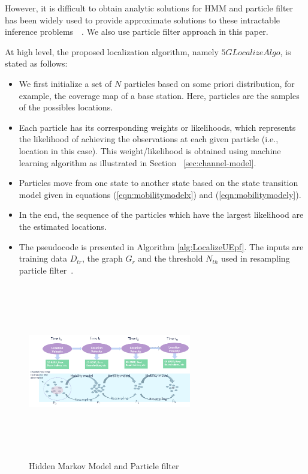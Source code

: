 \documentclass[conference, 10pt]{IEEEtran}
\begin{document}
However, it is difficult to obtain analytic solutions for HMM and particle filter has been widely used to provide approximate solutions to these intractable inference problems~\cite{doucet2009tutorial}~\cite{ThrunParticleFilter}.
We also use particle filter approach in this paper. 

At high level, the proposed localization algorithm, namely $5GLocalizeAlgo$, is stated as follows:
\begin{itemize}
	\item We first initialize a set of $N$ particles based on some priori distribution, for example, the coverage map of a base station.
	Here, particles are the samples of the possibles locations. 
	\item Each particle has its corresponding weights or likelihoods, which represents the likelihood of achieving the observations at each given particle (i.e., location in this case). This weight/likelihood is obtained using machine learning algorithm as illustrated in Section ~\ref{sec:channel-model}.
	\item Particles move from one state to another state based 
	on the state transition model given in equations (\ref{eqn:mobilitymodelx}) and (\ref{eqn:mobilitymodely}).
	\item In the end, the sequence of the particles which have the largest likelihood are the estimated locations. 
	\item The pseudocode is presented in Algorithm \ref{alg:LocalizeUEpf}. The inputs are training data $D_{tr}$, the graph $G_r$ and the threshold $N_{th}$ used in resampling particle filter~\cite{ThrunParticleFilter}.
\end{itemize}

\begin{figure}[t]
	\begin{center}
	\includegraphics[height=3in,width=2.8in]{./HMM_ParticleFilter_Illustration.png}
	\caption{\label{fig:hmm_particle}
	{\small Hidden Markov Model and Particle filter}}
	\end{center}
	\end{figure}
\end{document}

